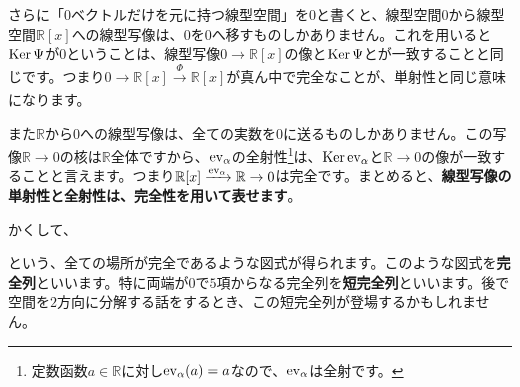 さらに「$0$ベクトルだけを元に持つ線型空間」を$0$と書くと、線型空間$0$から線型空間$\mathbb{R}[x]$への線型写像は、$0$を$0$へ移すものしかありません。これを用いると$\operatorname{Ker} \Psi$が$0$ということは、線型写像$0\rightarrow\mathbb{R}[x]$の像と$\operatorname{Ker} \Psi$とが一致することと同じです。つまり$0\rightarrow \mathbb{R}[x]\xrightarrow[]{\Phi}\mathbb{R}[x]$が真ん中で完全なことが、単射性と同じ意味になります。

また$\mathbb{R}$から$0$への線型写像は、全ての実数を$0$に送るものしかありません。この写像$\mathbb{R}\rightarrow 0$の核は$\mathbb{R}$全体ですから、$\operatorname{ev}_{\alpha}$の全射性\footnote{定数函数$a \in\mathbb{R}$に対し$\operatorname{ev}_{\alpha}(a) = a$なので、$\operatorname{ev}_{\alpha}$は全射です。}は、$\operatorname{Ker} \operatorname{ev}_{\alpha}$と$\mathbb{R}\rightarrow 0$の像が一致することと言えます。つまり$\mathbb{R}[x]\xrightarrow[]{\operatorname{ev}_{\alpha}}\mathbb{R}\rightarrow 0$は完全です。まとめると、\textbf{線型写像の単射性と全射性は、完全性を用いて表せます}。

かくして、
\begin{center}
\end{center}
という、全ての場所が完全であるような図式が得られます。このような図式を\textbf{完全列}といいます。特に両端が$0$で$5$項からなる完全列を\textbf{短完全列}といいます。後で空間を$2$方向に分解する話をするとき、この短完全列が登場するかもしれません。


